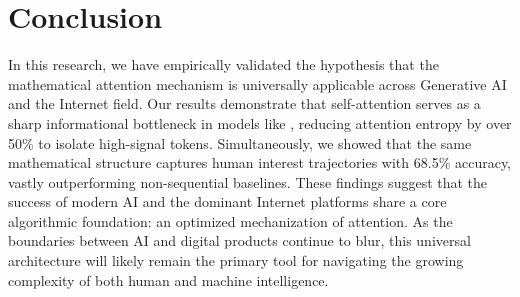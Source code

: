 \section{Conclusion}
\label{sec:conclusion}

In this research, we have empirically validated the hypothesis that the mathematical attention mechanism is universally applicable across Generative AI and the Internet field. Our results demonstrate that self-attention serves as a sharp informational bottleneck in models like \gpttwo, reducing attention entropy by over 50\% to isolate high-signal tokens. Simultaneously, we showed that the same mathematical structure captures human interest trajectories with 68.5\% accuracy, vastly outperforming non-sequential baselines. These findings suggest that the success of modern AI and the dominant Internet platforms share a core algorithmic foundation: an optimized mechanization of attention. As the boundaries between AI and digital products continue to blur, this universal architecture will likely remain the primary tool for navigating the growing complexity of both human and machine intelligence.
